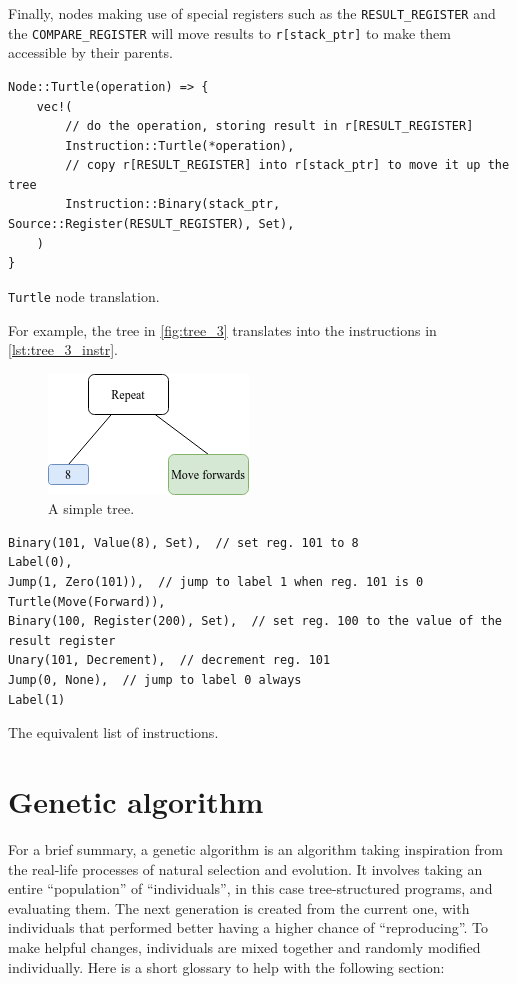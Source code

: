 \documentclass{report}
\newenvironment{code}{\captionsetup{type=listing}}{}
\begin{document}
Finally, nodes making use of special registers such as the \verb|RESULT_REGISTER| and the \verb|COMPARE_REGISTER| will move results to \verb|r[stack_ptr]| to make them accessible by their parents.

\begin{code}
    \begin{verbatim}
Node::Turtle(operation) => {
    vec!(
        // do the operation, storing result in r[RESULT_REGISTER]
        Instruction::Turtle(*operation),
        // copy r[RESULT_REGISTER] into r[stack_ptr] to move it up the tree
        Instruction::Binary(stack_ptr, Source::Register(RESULT_REGISTER), Set),
    )
}
    \end{verbatim}
    \caption{\texttt{Turtle} node translation.}
    \label{lst:turtle_translation}
\end{code}

For example, the tree in \autoref{fig:tree_3} translates into the instructions in \autoref{lst:tree_3_instr}.

\begin{figure}[ht]
    \centering
    \includegraphics{tree_3}
    \caption{A simple tree.}
    \label{fig:tree_3}
\end{figure}

\begin{code}
    \begin{verbatim}
Binary(101, Value(8), Set),  // set reg. 101 to 8
Label(0),
Jump(1, Zero(101)),  // jump to label 1 when reg. 101 is 0
Turtle(Move(Forward)),
Binary(100, Register(200), Set),  // set reg. 100 to the value of the result register
Unary(101, Decrement),  // decrement reg. 101
Jump(0, None),  // jump to label 0 always
Label(1)
    \end{verbatim}
    \caption{The equivalent list of instructions.}
    \label{lst:tree_3_instr}
\end{code}

\section{Genetic algorithm}

For a brief summary, a genetic algorithm is an algorithm taking inspiration from the real-life processes of natural selection and evolution. It involves taking an entire ``population'' of ``individuals'', in this case tree-structured programs, and evaluating them. The next generation is created from the current one, with individuals that performed better having a higher chance of ``reproducing''. To make helpful changes, individuals are mixed together and randomly modified individually. Here is a short glossary to help with the following section:
\end{document}

